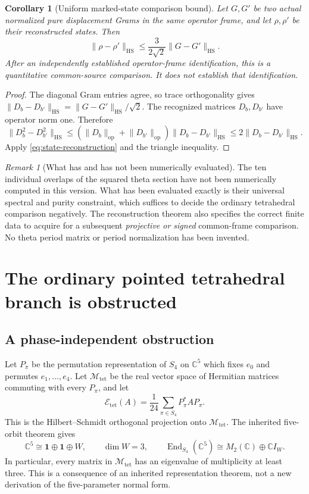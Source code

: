 \documentclass[11pt]{article}
\newtheorem{corollary}[corollary]{Corollary}
\theoremstyle{definition}
\theoremstyle{remark}
\newtheorem{remark}[remark]{Remark}
\newcommand{\C}{\mathbb C}
\newcommand{\End}{\operatorname{End}}
\newcommand{\HS}{\mathrm{HS}}
\newcommand{\op}{\mathrm{op}}
\newcommand{\norm}[1]{\lVert#1\rVert}
\newcommand{\AR}{\mathcal E_{\mathrm{tet}}}
\newcommand{\Mtet}{\mathscr M_{\mathrm{tet}}}
\newcommand{\one}{\mathbf1}
\begin{document}
\begin{corollary}[Uniform marked-state comparison bound]
\label{cor:state-stability}
Let $G,G'$ be two actual normalized pure displacement Grams in the same
operator frame, and let $\rho,\rho'$ be their reconstructed states. Then
\begin{equation}
 \boxed{\norm{\rho-\rho'}_{\HS}
       \le\frac{3}{2\sqrt2}\norm{G-G'}_{\HS}.}
 \label{eq:state-stability}
\end{equation}
After an independently established operator-frame identification, this is a
quantitative common-source comparison. It does not establish that identification.
\end{corollary}
\begin{proof}
The diagonal Gram entries agree, so trace orthogonality gives
$\norm{D_b-D_{b'}}_{\HS}=\norm{G-G'}_{\HS}/\sqrt2$.
The recognized matrices $D_b,D_{b'}$ have operator norm one. Therefore
\[
 \norm{D_b^2-D_{b'}^2}_{\HS}
 \le(\norm{D_b}_{\op}+\norm{D_{b'}}_{\op})
       \norm{D_b-D_{b'}}_{\HS}
 \le2\norm{D_b-D_{b'}}_{\HS}.
\]
Apply \eqref{eq:state-reconstruction} and the triangle inequality.
\end{proof}

\begin{remark}[What has and has not been numerically evaluated]
The ten individual overlaps of the squared theta section have not been
numerically computed in this version. What has been evaluated exactly is
their universal spectral and purity constraint, which suffices to decide the
ordinary tetrahedral comparison negatively. The reconstruction theorem also
specifies the correct finite data to acquire for a subsequent \emph{projective
or signed} common-frame comparison. No theta period matrix or period
normalization has been invented.
\end{remark}

\section{The ordinary pointed tetrahedral branch is obstructed}
\label{sec:obstruction}

\subsection{A phase-independent obstruction}
Let $P_\pi$ be the permutation representation of $S_4$ on $\C^5$ which fixes
$e_0$ and permutes $e_1,\ldots,e_4$. Let $\Mtet$ be the real vector space of
Hermitian matrices commuting with every $P_\pi$, and let
\begin{equation}
 \AR(A)=\frac1{24}\sum_{\pi\in S_4}P_\pi^*AP_\pi.
 \label{eq:Reynolds}
\end{equation}
This is the Hilbert--Schmidt orthogonal projection onto $\Mtet$.
The inherited five-orbit theorem gives
\begin{equation}
 \C^5\cong\one\oplus\one\oplus W,\qquad \dim W=3,
 \qquad
 \End_{S_4}(\C^5)\cong M_2(\C)\oplus\C I_W.
 \label{eq:tet-decomp}
\end{equation}
In particular, every matrix in $\Mtet$ has an eigenvalue of multiplicity at
least three. This is a consequence of an inherited representation theorem,
not a new derivation of the five-parameter normal form.
\end{document}

